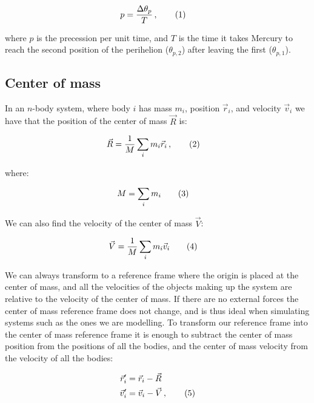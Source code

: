 \documentclass[reprint,english,notitlepage]{revtex4-1}  %
\newcommand\numberthis{\addtocounter{equation}{1}\tag{\theequation}}
\begin{document}
\begin{align*}
p &= \frac{\Delta \theta_p}{T} \, , \numberthis \label{eq:precession}
\end{align*}

where $p$ is the precession per unit time, and $T$ is the time it takes Mercury to reach the second position of the perihelion ($\theta_{p,2}$) after leaving the first ($\theta_{p,1}$).

\subsection{Center of mass} \label{sec:II:f}

In an $n$-body system, where body $i$ has mass $m_i$, position $\vec{r}_i$, and velocity $\vec{v}_i$ we have that the position of the center of mass $\vec{R}$ is:

\begin{align*}
\vec{R} &= \frac{1}{M}\sum\limits_i m_i \vec{r}_i \, , \numberthis \label{eq:cofm_pos}
\end{align*}

where:

\begin{align*}
M &= \sum\limits_i m_i \numberthis \label{eq:tot_mass}
\end{align*}

We can also find the velocity of the center of mass $\vec{V}$:

\begin{align*}
\vec{V} &= \frac{1}{M} \sum\limits_i m_i \vec{v}_i \numberthis \label{eq:cofm_vel}
\end{align*}

We can always transform to a reference frame where the origin is placed at the center of mass, and all the velocities of the objects making up the system are relative to the velocity of the center of mass. If there are no external forces the center of mass reference frame does not change, and is thus ideal when simulating systems such as the ones we are modelling. To transform our reference frame into the center of mass reference frame it is enough to subtract the center of mass position from the positions of all the bodies, and the center of mass velocity from the velocity of all the bodies:

\begin{align*}
\vec{r}_i' &= \vec{r}_i - \vec{R} \\
\vec{v}_i' &= \vec{v}_i - \vec{V} \, , \numberthis \label{eq:cofm_transform}
\end{align*}
\end{document}
